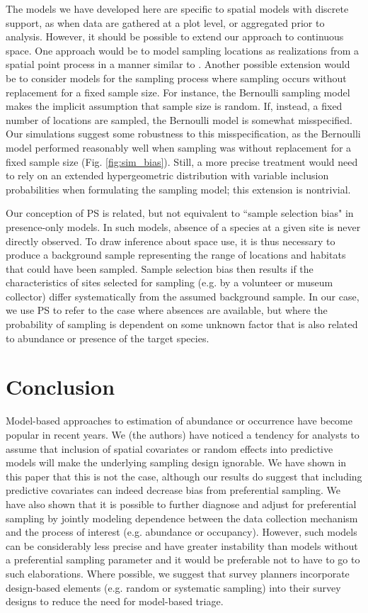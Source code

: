 \documentclass[times,mee,doublespace,]{besauth2}
\begin{document}
The models we have developed here are specific to spatial models with discrete support, as when data are gathered at a plot level, or aggregated prior to analysis.  However, it should be possible to extend our approach to continuous space.  One approach would be to model sampling locations as realizations from a spatial point process in a manner similar to \citet{WartonShepherd2010}. Another possible extension would be to consider models for the sampling process where sampling occurs without replacement for a fixed sample size.  For instance, the Bernoulli sampling model makes the implicit assumption that sample size is random.  If, instead, a fixed number of locations are sampled, the Bernoulli model is somewhat misspecified.  Our simulations suggest some robustness to this misspecification, as the Bernoulli model performed reasonably well when sampling was without replacement for a fixed sample size (Fig. \ref{fig:sim_bias}).  Still, a more precise treatment would need to rely on an extended hypergeometric distribution with variable inclusion probabilities when formulating the sampling model; this extension is nontrivial.

Our conception of PS is related, but not equivalent to ``sample selection bias" \citep[e.g.][]{PhillipsEtAl2009} in presence-only models.  In such models, absence of a species at a given site is never directly observed.  To draw inference about space use, it is thus necessary to produce a background sample representing the range of locations and habitats that could have been sampled. Sample selection bias then results if the characteristics of sites selected for sampling (e.g. by a volunteer or museum collector) differ systematically from the assumed background sample.  In our case, we use PS to refer to the case where absences are available, but where the probability of sampling is dependent on some unknown factor that is also related to abundance or presence of the target species.

\section{Conclusion}

Model-based approaches to estimation of abundance or occurrence have become popular in recent years.  We (the authors) have noticed a tendency for analysts to assume that inclusion of spatial covariates or random effects into predictive models will make the underlying sampling design ignorable. We have shown in this paper that this is not the case, although our results do suggest that including predictive covariates can indeed decrease bias from preferential sampling.  We have also shown that it is possible to further diagnose and adjust for preferential sampling by jointly modeling dependence between the data collection mechanism and the process of interest (e.g. abundance or occupancy).  However, such models can be considerably less precise and have greater instability than models without a preferential sampling parameter and it would be preferable not to have to go to such elaborations. Where possible, we suggest that survey planners incorporate design-based elements (e.g. random or systematic sampling) into their survey designs to reduce the need for model-based triage.
\end{document}
